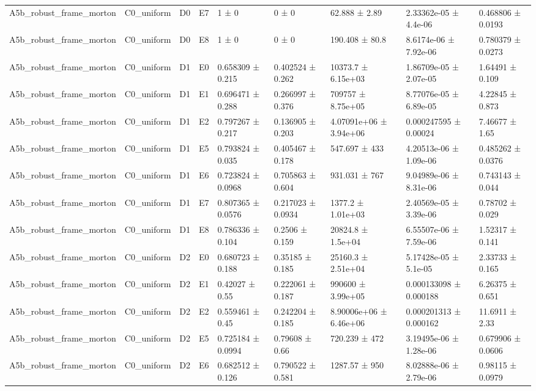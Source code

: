 \begin{table}
\begin{tabular}{lllllllll}
A5b\_robust\_frame\_morton & C0\_uniform & D0 & E7 & 1 ± 0 & 0 ± 0 & 62.888 ± 2.89 & 2.33362e-05 ± 4.4e-06 & 0.468806 ± 0.0193 \\
A5b\_robust\_frame\_morton & C0\_uniform & D0 & E8 & 1 ± 0 & 0 ± 0 & 190.408 ± 80.8 & 8.6174e-06 ± 7.92e-06 & 0.780379 ± 0.0273 \\
A5b\_robust\_frame\_morton & C0\_uniform & D1 & E0 & 0.658309 ± 0.215 & 0.402524 ± 0.262 & 10373.7 ± 6.15e+03 & 1.86709e-05 ± 2.07e-05 & 1.64491 ± 0.109 \\
A5b\_robust\_frame\_morton & C0\_uniform & D1 & E1 & 0.696471 ± 0.288 & 0.266997 ± 0.376 & 709757 ± 8.75e+05 & 8.77076e-05 ± 6.89e-05 & 4.22845 ± 0.873 \\
A5b\_robust\_frame\_morton & C0\_uniform & D1 & E2 & 0.797267 ± 0.217 & 0.136905 ± 0.203 & 4.07091e+06 ± 3.94e+06 & 0.000247595 ± 0.00024 & 7.46677 ± 1.65 \\
A5b\_robust\_frame\_morton & C0\_uniform & D1 & E5 & 0.793824 ± 0.035 & 0.405467 ± 0.178 & 547.697 ± 433 & 4.20513e-06 ± 1.09e-06 & 0.485262 ± 0.0376 \\
A5b\_robust\_frame\_morton & C0\_uniform & D1 & E6 & 0.723824 ± 0.0968 & 0.705863 ± 0.604 & 931.031 ± 767 & 9.04989e-06 ± 8.31e-06 & 0.743143 ± 0.044 \\
A5b\_robust\_frame\_morton & C0\_uniform & D1 & E7 & 0.807365 ± 0.0576 & 0.217023 ± 0.0934 & 1377.2 ± 1.01e+03 & 2.40569e-05 ± 3.39e-06 & 0.78702 ± 0.029 \\
A5b\_robust\_frame\_morton & C0\_uniform & D1 & E8 & 0.786336 ± 0.104 & 0.2506 ± 0.159 & 20824.8 ± 1.5e+04 & 6.55507e-06 ± 7.59e-06 & 1.52317 ± 0.141 \\
A5b\_robust\_frame\_morton & C0\_uniform & D2 & E0 & 0.680723 ± 0.188 & 0.35185 ± 0.185 & 25160.3 ± 2.51e+04 & 5.17428e-05 ± 5.1e-05 & 2.33733 ± 0.165 \\
A5b\_robust\_frame\_morton & C0\_uniform & D2 & E1 & 0.42027 ± 0.55 & 0.222061 ± 0.187 & 990600 ± 3.99e+05 & 0.000133098 ± 0.000188 & 6.26375 ± 0.651 \\
A5b\_robust\_frame\_morton & C0\_uniform & D2 & E2 & 0.559461 ± 0.45 & 0.242204 ± 0.185 & 8.90006e+06 ± 6.46e+06 & 0.000201313 ± 0.000162 & 11.6911 ± 2.33 \\
A5b\_robust\_frame\_morton & C0\_uniform & D2 & E5 & 0.725184 ± 0.0994 & 0.79608 ± 0.66 & 720.239 ± 472 & 3.19495e-06 ± 1.28e-06 & 0.679906 ± 0.0606 \\
A5b\_robust\_frame\_morton & C0\_uniform & D2 & E6 & 0.682512 ± 0.126 & 0.790522 ± 0.581 & 1287.57 ± 950 & 8.02888e-06 ± 2.79e-06 & 0.98115 ± 0.0979 \\

\end{tabular}
\end{table}
